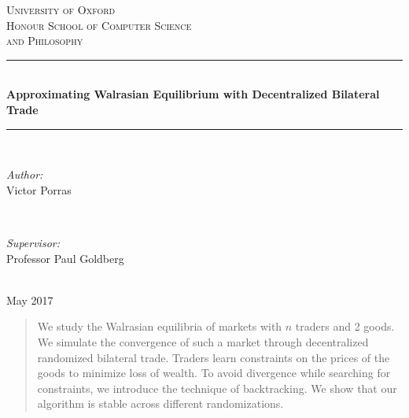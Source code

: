 \documentclass[12pt,a4paper,titlepage]{article}
\begin{document}
\begin{titlepage}

\newcommand{\HRule}{\rule{\linewidth}{0.5mm}} %

\center %
 
\textsc{\LARGE University of Oxford}\\[1.5cm] %
\textsc{\LARGE Honour School of Computer Science \\[0.2cm] and Philosophy}\\[0.5cm] %

\HRule \\[0.4cm]
{ \LARGE \bfseries Approximating Walrasian Equilibrium with Decentralized Bilateral Trade}\\[0.3cm] %
\HRule \\[2cm]
 
\begin{minipage}{0.45\textwidth}
\begin{flushleft} \Large
\emph{Author:}\\
Victor Porras %
\end{flushleft}
\end{minipage}
~
\begin{minipage}{0.45\textwidth}
\begin{flushright} \Large
\emph{Supervisor:} \\
Professor Paul Goldberg %
\end{flushright}
\end{minipage}\\[2cm]

{\Large {May 2017}}\\[2cm]

 

\vfill %

\end{titlepage}

\begin{abstract}
  We study the Walrasian equilibria of markets with $n$ traders and 2 goods.
  We simulate the convergence of such a market through decentralized randomized bilateral trade.
  Traders learn constraints on the prices of the goods to minimize loss of wealth.
  To avoid divergence while searching for constraints, we introduce the technique of backtracking.
  We show that our algorithm is stable across different randomizations.
\end{abstract}
\end{document}

